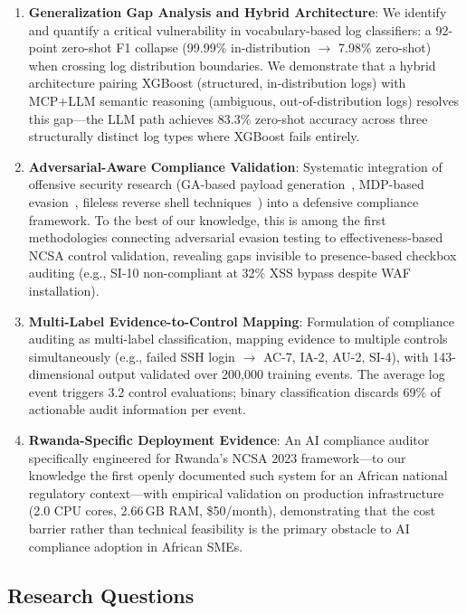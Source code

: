\documentclass[futureinternet,article,submit,pdftex,moreauthors]{Definitions/mdpi}
\begin{document}
\begin{enumerate}
\item \textbf{Generalization Gap Analysis and Hybrid Architecture}: We identify and quantify
a critical vulnerability in vocabulary-based log classifiers: a 92-point zero-shot F1
collapse (99.99\% in-distribution $\rightarrow$ 7.98\% zero-shot) when crossing log
distribution boundaries. We demonstrate that a hybrid architecture pairing XGBoost
(structured, in-distribution logs) with MCP+LLM semantic reasoning (ambiguous,
out-of-distribution logs) resolves this gap---the LLM path achieves 83.3\% zero-shot
accuracy across three structurally distinct log types where XGBoost fails entirely.

\item \textbf{Adversarial-Aware Compliance Validation}: Systematic integration of offensive
security research (GA-based payload generation~\cite{ga_xss_paper}, MDP-based
evasion~\cite{dp_payload_paper}, fileless reverse shell techniques~\cite{reverse_shell_paper})
into a defensive compliance framework. To the best of our knowledge, this is among the first
methodologies connecting adversarial evasion testing to effectiveness-based NCSA control
validation, revealing gaps invisible to presence-based checkbox auditing
(e.g., SI-10 non-compliant at 32\% XSS bypass despite WAF installation).

\item \textbf{Multi-Label Evidence-to-Control Mapping}: Formulation of compliance auditing as
multi-label classification, mapping evidence to multiple controls simultaneously
(e.g., failed SSH login $\rightarrow$ AC-7, IA-2, AU-2, SI-4), with 143-dimensional output
validated over 200{,}000 training events. The average log event triggers 3.2 control
evaluations; binary classification discards 69\% of actionable audit information per event.

\item \textbf{Rwanda-Specific Deployment Evidence}: An AI compliance auditor specifically
engineered for Rwanda's NCSA 2023 framework---to our knowledge the first openly documented
such system for an African national regulatory context---with empirical validation on
production infrastructure (2.0 CPU cores, 2.66\,GB RAM, \$50/month), demonstrating that
the cost barrier rather than technical feasibility is the primary obstacle to AI compliance
adoption in African SMEs.
\end{enumerate}

\subsection{Research Questions}
\end{document}
